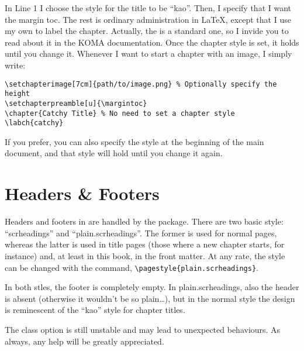 In Line 1 I choose the style for the title to be \enquote{kao}. Then, I 
specify that I want the margin toc. The rest is ordinary administration 
in \LaTeX, except that I use my own  to label the 
chapter. Actually, the  is a standard 
\KOMAScript\xspace one, so I invide you to read about it in the KOMA 
documentation. Once the chapter style is set, it holds until you change 
it. Whenever I want to start a chapter with an image, 
I simply write:

\begin{lstlisting}
\setchapterimage[7cm]{path/to/image.png} % Optionally specify the height
\setchapterpreamble[u]{\margintoc}
\chapter{Catchy Title} % No need to set a chapter style
\labch{catchy}
\end{lstlisting}

If you prefer, you can also specify the style at the beginning of the 
main document, and that style will hold until you change it again.

\section{Headers \& Footers}

Headers and footers in \KOMAScript\xspace are handled by the 
 package. There are two basic style: 
\enquote{scrheadings} and \enquote{plain.scrheadings}. The former is 
used for normal pages, whereas the latter is used in title pages (those 
where a new chapter starts, for instance) and, at least in this book, in 
the front matter. At any rate, the style can be changed with the 
 command, \eg 
\lstinline|\pagestyle{plain.scrheadings}|.

In both stles, the footer is completely empty. In plain.scrheadings, 
also the header is absent (otherwise it wouldn't be so plain\ldots), but 
in the normal style the design is reminescent of the \enquote{kao} style 
for chapter titles.

\begin{kaobox}[frametitle=To Do]
The  class option is still unstable and may lead to 
unexpected behaviours. As always, any help will be greatly appreciated.
\end{kaobox}

